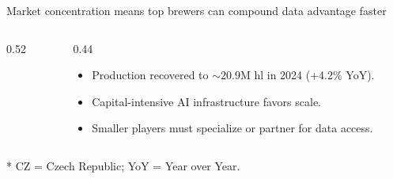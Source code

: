 \documentclass[aspectratio=169,10pt]{beamer}
\newcommand{\acronymnote}[1]{%
  \vfill
  {\raggedright\tiny\color{MutedGray}* #1\par}
}
\begin{document}
\begin{frame}{Market concentration means top brewers can compound data advantage faster}
  \begin{columns}[c,onlytextwidth]
    \begin{column}{0.52\textwidth}
    \end{column}
    \begin{column}{0.44\textwidth}
      \footnotesize
      \begin{itemize}[<+->]\setlength\itemsep{0.9em}
        \item Production recovered to \(\sim 20.9\)M hl in 2024 (+4.2\% YoY).
        \item Capital-intensive AI infrastructure favors scale.
        \item Smaller players must specialize or partner for data access.
      \end{itemize}
    \end{column}
  \end{columns}
  \acronymnote{CZ = Czech Republic; YoY = Year over Year.}
\end{frame}
\end{document}
